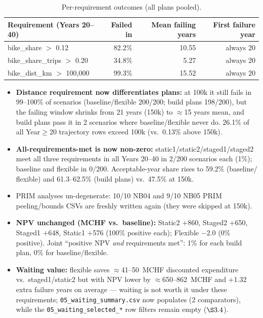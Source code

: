 \documentclass[11pt,a4paper]{article}
\begin{document}
\begin{table}[h]
\centering\small
\begin{tabular}{@{}lrrr@{}}
\toprule
Requirement (Years 20--40) & Failed in & Mean failing years & First failure year \\
\midrule
bike\_share ${>}$ 0.12          & 82.2\% & 10.55 & always 20 \\
bike\_share\_trips ${>}$ 0.20   & 34.8\% & 5.27  & always 20 \\
bike\_dist\_km ${>}$ 100{,}000 & 99.3\% & 15.52 & always 20 \\
\bottomrule
\end{tabular}
\caption{Per-requirement outcomes (all plans pooled).}
\end{table}

\begin{itemize}
  \item \textbf{Distance requirement now differentiates plans:} at 100k it still fails in
        99--100\% of scenarios (baseline/flexible 200/200; build plans 198/200), but the
        failing window shrinks from 21 years (150k) to $\approx$15 years mean, and build
        plans pass it in 2 scenarios where baseline/flexible never do. 26.1\% of all
        Year$\geq$20 trajectory rows exceed 100k (vs.\ 0.13\% above 150k).
  \item \textbf{All-requirements-met is now non-zero:} static1/static2/staged1/staged2 meet
        all three requirements in all Years 20--40 in 2/200 scenarios each (1\%);
        baseline and flexible in 0/200. Acceptable-year share rises to 59.2\% (baseline/
        flexible) and 61.3--62.5\% (build plans) vs.\ 47.5\% at 150k.
  \item PRIM analyses un-degenerate: 10/10 NB04 and 9/10 NB05 PRIM peeling/bounds CSVs
        are freshly written again (they were skipped at 150k).
  \item \textbf{NPV unchanged (MCHF vs.\ baseline):} Static2 $+$860, Staged2 $+$650,
        Staged1 $+$648, Static1 $+$576 (100\% positive each); Flexible $-2.0$ (0\%
        positive). Joint ``positive NPV \emph{and} requirements met'': 1\% for each
        build plan, 0\% for baseline/flexible.
  \item \textbf{Waiting value:} flexible saves $\approx$41--50~MCHF discounted expenditure
        vs.\ staged1/static2 but with NPV lower by $\approx$650--862~MCHF and
        $+$1.32 extra failure years on average --- waiting is not worth it under these
        requirements; \texttt{05\_waiting\_summary.csv} now populates (2 comparators),
        while the \texttt{05\_waiting\_selected\_*} row filters remain empty
        ($\S3.4$).
\end{itemize}
\end{document}
